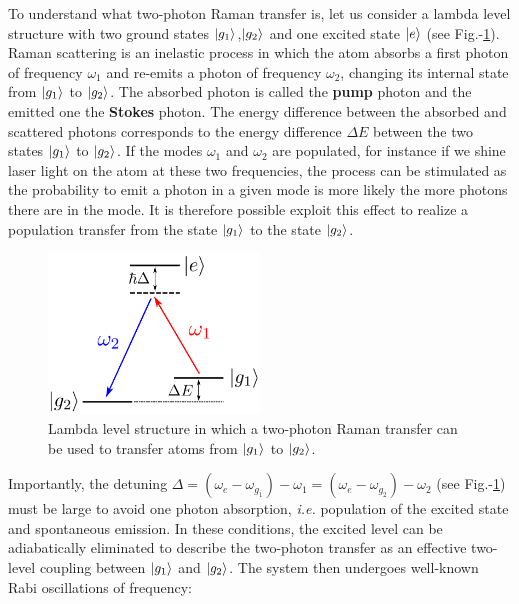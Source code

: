 
To understand what two-photon Raman transfer is, let us consider a lambda level structure with two ground states $\ket{g_1}$,$\ket{g_2}$ and one excited state $\ket{e}$ (see Fig.-\ref{fig:raman_level}). Raman scattering is an inelastic process in which the atom absorbs a first photon of frequency $\omega_1$ and re-emits a photon of frequency $\omega_2$, changing its internal state from $\ket{g_1}$ to $\ket{g_2}$. The absorbed photon is called the \textbf{pump} photon and the emitted one the \textbf{Stokes} photon. The energy difference between the absorbed and scattered photons corresponds to the energy difference $\Delta E$ between the two states $\ket{g_1}$ to $\ket{g_2}$. If the modes $\omega_1$ and $\omega_2$ are populated, for instance if we shine laser light on the atom at these two frequencies, the process can be stimulated as the probability to emit a photon in a given mode is more likely the more photons there are in the mode. It is therefore possible exploit this effect to realize a population transfer from the state $\ket{g_1}$ to the state $\ket{g_2}$.


\begin{figure}
    \centering
    \includegraphics[width=0.5\textwidth]{Fig/Chapter3/raman_level.png}
    \caption[Lambda level structure for two-photon Raman transfer]{Lambda level structure in which a two-photon Raman transfer can be used to transfer atoms from $\ket{g_1}$ to $\ket{g_2}$.}
    \label{fig:raman_level}
\end{figure}


Importantly, the detuning $\Delta=(\omega_{e}-\omega_{g_1})-\omega_1=(\omega_{e}-\omega_{g_2})-\omega_2$ (see Fig.-\ref{fig:raman_level}) must be large to avoid one photon absorption, {\it i.e.} population of the excited state and spontaneous emission. In these conditions, the excited level can be adiabatically eliminated to describe the two-photon transfer as an effective two-level coupling between $\ket{g_1}$ and $\ket{g_2}$. The system then undergoes well-known Rabi oscillations of frequency:

